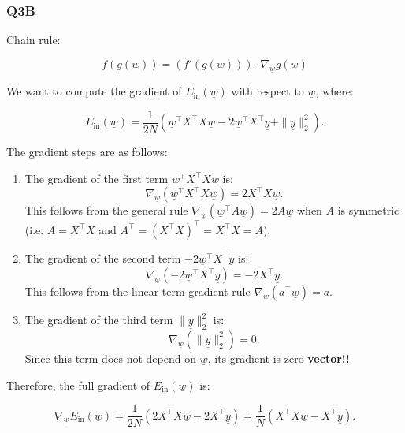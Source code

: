 \subsubsection{Q3B}
\begin{definition}
    Chain rule: 

    \begin{equation}
        f(g(\underline{w})) = (f'(g(\underline{w}))) \cdot \nabla_{\underline{w}} g(\underline{w})
    \end{equation}
\end{definition}
\begin{example}
    We want to compute the gradient of \( E_{\text{in}}(\underline{w}) \) with respect to \( \underline{w} \), where:

    \[
    E_{\text{in}}(\underline{w}) = \frac{1}{2N} \left( \underline{w}^\top X^\top X \underline{w} - 2 \underline{w}^\top X^\top \underline{y} + \| \underline{y} \|_2^2 \right).
    \]

    The gradient steps are as follows:

    \begin{enumerate}
        \item The gradient of the first term \( \underline{w}^\top X^\top X \underline{w} \) is:
        \[
        \nabla_{\underline{w}} \left( \underline{w}^\top X^\top X \underline{w} \right) = 2 X^\top X \underline{w}.
        \]
        This follows from the general rule \( \nabla_{\underline{w}} ( \underline{w}^\top A \underline{w} ) = 2A \underline{w} \) when \( A \) is symmetric (i.e. \( A = X^\top X \) and \( A^\top = (X^\top X)^\top = X^\top X = A \)).

        \item The gradient of the second term \( -2 \underline{w}^\top X^\top \underline{y} \) is:
        \[
        \nabla_{\underline{w}} \left( -2 \underline{w}^\top X^\top \underline{y} \right) = -2 X^\top \underline{y}.
        \]
        This follows from the linear term gradient rule \( \nabla_{\underline{w}} (a^\top \underline{w}) = a \).

        \item The gradient of the third term \( \| \underline{y} \|_2^2 \) is:
        \[
        \nabla_{\underline{w}} \left( \| \underline{y} \|_2^2 \right) = \underline{0}.
        \]
        Since this term does not depend on \( \underline{w} \), its gradient is zero \textbf{vector!!}
    \end{enumerate}

    Therefore, the full gradient of \( E_{\text{in}}(\underline{w}) \) is:

    \[
    \nabla_{\underline{w}} E_{\text{in}}(\underline{w}) = \frac{1}{2N} \left( 2 X^\top X \underline{w} - 2 X^\top \underline{y} \right) = \frac{1}{N} \left( X^\top X \underline{w} - X^\top \underline{y} \right).
    \]
\end{example}

